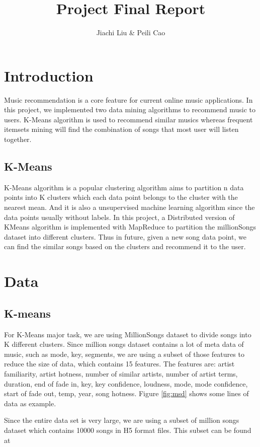 \documentclass[11pt]{article} %
\title{Project Final Report}
\author{Jiachi Liu \& Peili Cao}
\begin{document}
\maketitle

\section{Introduction}
Music recommendation is a core feature for current online music applications. In this project, we implemented two data mining algorithms to recommend music to users. K-Means algorithm is used to recommend similar musics whereas frequent itemsets mining will find the combination of songs that most user will listen together.

\subsection{K-Means}
K-Means algorithm is a popular clustering algorithm aims to partition n data points into K clusters which each data point belongs to the cluster with the nearest mean. And it is also a unsupervised machine learning algorithm since the data points usually without labels. In this project, a Distributed version of KMeans algorithm is implemented with MapReduce to partition the millionSongs dataset into different clusters. Thus in future, given a new song data point, we can find the similar songs based on the clusters and recommend it to the user.

\section{Data}
\subsection{K-means}
For K-Means major task, we are using MillionSongs dataset to divide songs into K different clusters. Since million songs dataset contains a lot of meta data of music, such as mode, key, segments, we are using a subset of those features to reduce the size of data, which contains 15 features. The features are: artist familiarity, artist hotness, number of similar artists, number of artist terms, duration, end of fade in, key, key confidence, loudness, mode, mode confidence, start of fade out, temp, year, song hotness. Figure \ref{fig:msd} shows some lines of data as example.

Since the entire data set is very large, we are using a subset of million songs dataset which contains 10000 songs in H5 format files. This subset can be found at 
\end{document}
